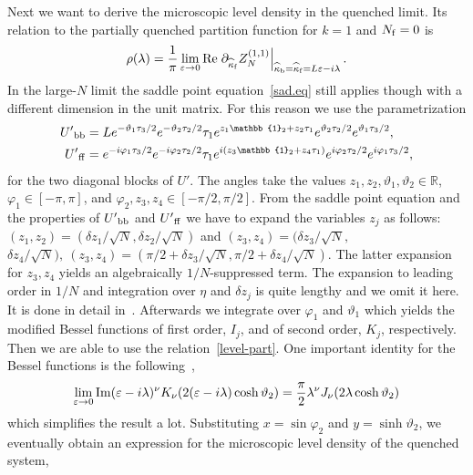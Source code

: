 \documentclass[aps,prl,reprint,graphicx,showpacs]{revtex4-1}
\newcommand{\id}{\mathbb{1}}
\renewcommand{\epsilon}{\varepsilon}
\begin{document}
Next we want to derive the microscopic level density in the quenched limit. Its relation to the partially quenched partition function for $k=1$ and $N_{\rm f}=0$ is
\begin{equation}\label{level-part}
\rho(\lambda)=\frac{1}{\pi}\lim_{\epsilon\to0}{\rm Re}\left.\partial_{\widehat{\kappa}_{\rm f}}Z_N^{(1,1)}\right|_{\widehat{\kappa}_{\rm b}=\widehat{\kappa}_{\rm f}=L\epsilon-i \lambda}.
\end{equation}
In the large-$N$ limit the saddle point equation~\eqref{sad.eq} still applies though with a different dimension in the unit matrix. For this reason we use the parametrization
\begin{equation}
\begin{split}
{U'}_{\rm bb}& = Le^{-\vartheta_1\tau_3/2}e^{-\vartheta_2\tau_2/2}\tau_1e^{z_1\id_2+z_2 \tau_1}e^{\vartheta_2\tau_2/2}e^{\vartheta_1\tau_3/2},\\
{U'}_{\rm ff}& = e^{-i\varphi_1\tau_3/2}e^{-i\varphi_2\tau_2/2}\tau_1e^{i(z_3\id_2+z_4 \tau_1)}e^{i\varphi_2\tau_2/2}e^{i\varphi_1\tau_3/2},
\end{split}
\end{equation}
for the two diagonal blocks of $U'$. The angles take the values $z_1,z_2,\vartheta_1,\vartheta_2\in\mathbb{R}$, $\varphi_1\in[-\pi,\pi]$, and $\varphi_2,z_3,z_4\in[-\pi/2,\pi/2]$. From the saddle point equation and the properties of ${U'}_{\rm bb}$ and ${U'}_{\rm ff}$ we have to expand the variables $z_j$ as follows: $(z_1,z_2)=(\delta z_1/\sqrt{N},\delta z_2/\sqrt{N})$ and $(z_3,z_4)=(\delta z_3/\sqrt{N},$ $\delta z_4/\sqrt{N}), ~(z_3,z_4)=(\pi/2+\delta z_3/\sqrt{N},\pi/2+\delta z_4/\sqrt{N})$. The latter expansion for $z_3,z_4$ yields an algebraically $1/N$-suppressed term. The expansion to leading order in $1/N$ and integration over $\eta$ and $\delta z_j$ is quite lengthy and we omit it here. It is done in detail in~\cite{Kanazawa:2018b}. Afterwards we integrate over $\varphi_1$ and $\vartheta_1$ which yields the modified Bessel functions of first order, $I_j$, and of second order, $K_j$, respectively. Then we are able to use the relation~\eqref{level-part}. One important identity for the Bessel functions is the following~\cite[Eq.~(9.6.1)]{Abramowitz},
\begin{equation}
\lim_{\epsilon\to0}{\rm Im}(\epsilon-i \lambda)^\nu K_\nu(2(\epsilon-i \lambda)\cosh\vartheta_2)=\frac{\pi}{2}\lambda^\nu J_\nu(2\lambda\cosh\vartheta_2)
\end{equation}
which simplifies the result a lot. Substituting $x=\sin\varphi_2$ and $y=\sinh\vartheta_2$, we eventually obtain an expression for the microscopic level density of the quenched system,
\end{document}
